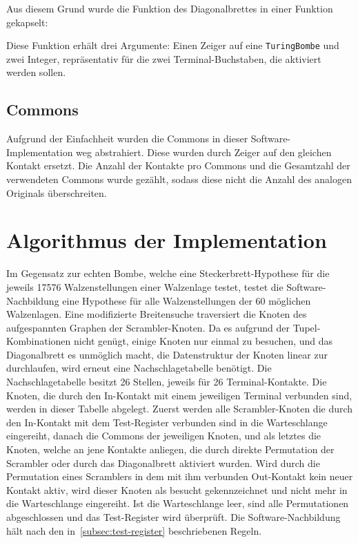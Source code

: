 Aus diesem Grund wurde die Funktion des Diagonalbrettes in einer Funktion gekapselt:

\noindent

Diese Funktion erhält drei Argumente: Einen Zeiger auf eine \texttt{TuringBombe} und zwei Integer, repräsentativ für die zwei Terminal-Buchstaben, die aktiviert werden sollen.


\subsection{Commons}\label{subsec:impl_commons}
Aufgrund der Einfachheit wurden die Commons in dieser Software-Implementation \glqq weg abstrahiert\grqq.
Diese wurden durch Zeiger auf den gleichen Kontakt ersetzt.
Die Anzahl der Kontakte pro Commons und die Gesamtzahl der verwendeten Commons wurde gezählt, sodass diese nicht die Anzahl des analogen Originals überschreiten.

\section{Algorithmus der Implementation}\label{sec:algorithm_bombe}
Im Gegensatz zur \glqq echten\grqq{} Bombe, welche eine Steckerbrett-Hypothese für die jeweils 17576 Walzenstellungen einer Walzenlage testet, testet die Software-Nachbildung eine Hypothese für alle Walzenstellungen der 60 möglichen Walzenlagen.
Eine modifizierte Breitensuche traversiert die Knoten des aufgespannten Graphen der \glqq Scrambler-Knoten\grqq.
Da es aufgrund der Tupel-Kombinationen nicht genügt, einige Knoten nur einmal zu besuchen, und das Diagonalbrett es unmöglich macht, die Datenstruktur der Knoten linear zur durchlaufen, wird erneut eine \glqq Nachschlagetabelle\grqq{} benötigt.
Die Nachschlagetabelle besitzt 26 Stellen, jeweils für 26 Terminal-Kontakte.
Die Knoten, die durch den In-Kontakt mit einem jeweiligen Terminal verbunden sind, werden in dieser Tabelle abgelegt.
Zuerst werden alle Scrambler-Knoten die durch den In-Kontakt mit dem Test-Register verbunden sind in die Warteschlange eingereiht, danach die Commons der jeweiligen Knoten, und als letztes die Knoten, welche an jene Kontakte anliegen, die durch direkte Permutation der Scrambler oder durch das Diagonalbrett aktiviert wurden.
Wird durch die Permutation eines Scramblers in dem mit ihm verbunden Out-Kontakt kein neuer Kontakt aktiv, wird dieser Knoten als \glqq besucht\grqq{} gekennzeichnet und nicht mehr in die Warteschlange eingereiht.
Ist die Warteschlange leer, sind alle Permutationen abgeschlossen und das Test-Register wird überprüft.
Die Software-Nachbildung hält nach den in~\cref{subsec:test-register} beschriebenen Regeln.

